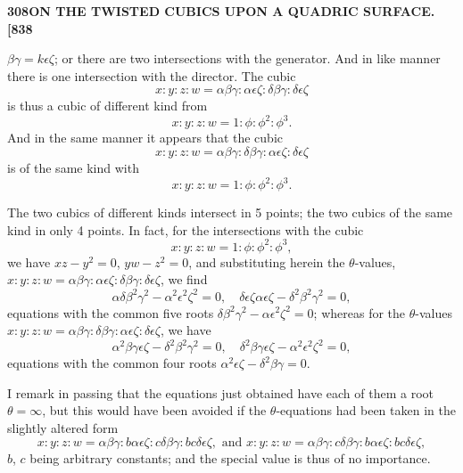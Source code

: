 \documentclass[12pt,a4paper]{article}
\theoremstyle{definition}
\begin{document}
\newpage
\setcounter{page}{308}

\noindent\textbf{308}\hfill\textbf{ON THE TWISTED CUBICS UPON A QUADRIC SURFACE.}\hfill\textbf{[838}

\bigskip

\noindent $\beta\gamma = k\epsilon\zeta$; or there are two intersections with the generator. And in like manner there is one intersection with the director. The cubic
\[
x : y : z : w = \alpha\beta\gamma : \alpha\epsilon\zeta : \delta\beta\gamma : \delta\epsilon\zeta
\]
is thus a cubic of different kind from
\[
x : y : z : w = 1 : \phi : \phi^2 : \phi^3.
\]
And in the same manner it appears that the cubic
\[
x : y : z : w = \alpha\beta\gamma : \delta\beta\gamma : \alpha\epsilon\zeta : \delta\epsilon\zeta
\]
is of the same kind with
\[
x : y : z : w = 1 : \phi : \phi^2 : \phi^3.
\]

The two cubics of different kinds intersect in 5 points; the two cubics of the same kind in only 4 points. In fact, for the intersections with the cubic
\[
x : y : z : w = 1 : \phi : \phi^2 : \phi^3,
\]
we have $xz - y^2 = 0$, $yw - z^2 = 0$, and substituting herein the $\theta$-values, $x : y : z : w = \alpha\beta\gamma : \alpha\epsilon\zeta : \delta\beta\gamma : \delta\epsilon\zeta$, we find
\[
\alpha\delta\beta^2\gamma^2 - \alpha^2\epsilon^2\zeta^2 = 0, \quad \delta\epsilon\zeta\alpha\epsilon\zeta - \delta^2\beta^2\gamma^2 = 0,
\]
equations with the common five roots $\delta\beta^2\gamma^2 - \alpha\epsilon^2\zeta^2 = 0$; whereas for the $\theta$-values $x : y : z : w = \alpha\beta\gamma : \delta\beta\gamma : \alpha\epsilon\zeta : \delta\epsilon\zeta$, we have
\[
\alpha^2\beta\gamma\epsilon\zeta - \delta^2\beta^2\gamma^2 = 0, \quad \delta^2\beta\gamma\epsilon\zeta - \alpha^2\epsilon^2\zeta^2 = 0,
\]
equations with the common four roots $\alpha^2\epsilon\zeta - \delta^2\beta\gamma = 0$.

I remark in passing that the equations just obtained have each of them a root $\theta = \infty$, but this would have been avoided if the $\theta$-equations had been taken in the slightly altered form
\[
x : y : z : w = \alpha\beta\gamma : b\alpha\epsilon\zeta : c\delta\beta\gamma : bc\delta\epsilon\zeta, \text{ and } x : y : z : w = \alpha\beta\gamma : c\delta\beta\gamma : b\alpha\epsilon\zeta : bc\delta\epsilon\zeta,
\]
$b$, $c$ being arbitrary constants; and the special value is thus of no importance.
\end{document}
